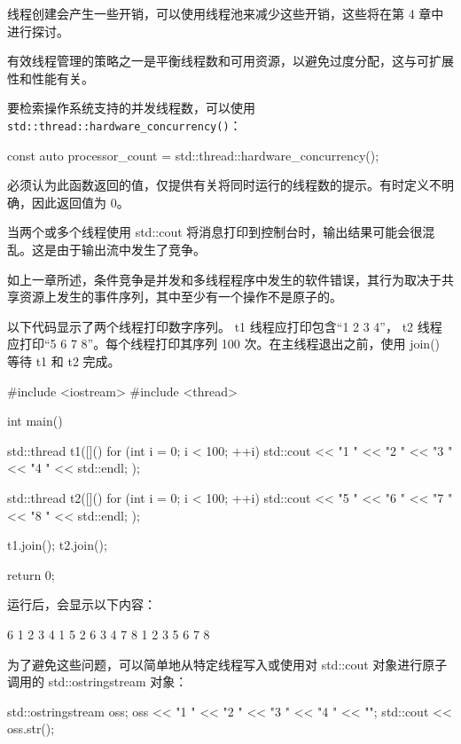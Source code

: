 线程创建会产生一些开销，可以使用线程池来减少这些开销，这些将在第 4 章中进行探讨。


有效线程管理的策略之一是平衡线程数和可用资源，以避免过度分配，这与可扩展性和性能有关。

要检索操作系统支持的并发线程数，可以使用 \verb|std::thread::hardware_concurrency()|：

\begin{cpp}
const auto processor_count = std::thread::hardware_concurrency();
\end{cpp}

必须认为此函数返回的值，仅提供有关将同时运行的线程数的提示。有时定义不明确，因此返回值为 0。


当两个或多个线程使用 std::cout 将消息打印到控制台时，输出结果可能会很混乱。这是由于输出流中发生了竞争。

如上一章所述，条件竞争是并发和多线程程序中发生的软件错误，其行为取决于共享资源上发生的事件序列，其中至少有一个操作不是原子的。

以下代码显示了两个线程打印数字序列。 t1 线程应打印包含“1 2 3 4”， t2 线程应打印“5 6 7 8”。每个线程打印其序列 100 次。在主线程退出之前，使用 join() 等待 t1 和 t2 完成。

\begin{cpp}
#include <iostream>
#include <thread>

int main() {
    std::thread t1([]() {
        for (int i = 0; i < 100; ++i) {
            std::cout << "1 " << "2 " << "3 " << "4 "
            << std::endl;
        }
    });

    std::thread t2([]() {
        for (int i = 0; i < 100; ++i) {
            std::cout << "5 " << "6 " << "7 " << "8 "
            << std::endl;
        }
    });

    t1.join();
    t2.join();

    return 0;
}
\end{cpp}

运行后，会显示以下内容：

\begin{shell}
6 1 2 3 4
1 5 2 6 3 4 7 8
1 2 3 5 6 7 8
\end{shell}

为了避免这些问题，可以简单地从特定线程写入或使用对 std::cout 对象进行原子调用的 std::ostringstream 对象：

\begin{cpp}
std::ostringstream oss;
oss << "1 " << "2 " << "3 " << "4 " << "\n";
std::cout << oss.str();
\end{cpp}


